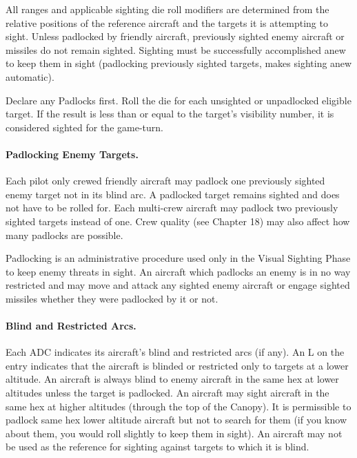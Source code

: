 All ranges and applicable sighting die roll modifiers are determined from the relative positions of the reference aircraft and the targets it is attempting to sight. Unless padlocked by friendly aircraft, previously sighted enemy aircraft or missiles do not remain sighted. Sighting must be successfully accomplished anew to keep them in sight (padlocking previously sighted targets, makes sighting anew automatic).

Declare any Padlocks first. Roll the die for each unsighted or unpadlocked eligible target. If the result is less than or equal to the target's visibility number, it is considered sighted for the game-turn. 

\paragraph{Padlocking Enemy Targets.} Each pilot only crewed friendly aircraft may padlock one previously sighted enemy target not in its blind arc. A padlocked target remains sighted and does not have to be rolled for. Each multi-crew aircraft may padlock two previously sighted targets instead of one. Crew quality (see Chapter 18) may also affect how many padlocks are possible.

Padlocking is an administrative procedure used only in the Visual Sighting Phase to keep enemy threats in sight. An aircraft which padlocks an enemy is in no way restricted and may move and attack any sighted enemy aircraft or engage sighted missiles whether they were padlocked by it or not. 

\paragraph{Blind and Restricted Arcs.} Each ADC indicates its aircraft's blind and restricted arcs (if any). An L on the entry indicates that the aircraft is blinded or restricted only to targets at a lower altitude. An aircraft is always blind to enemy aircraft in the same hex at lower altitudes unless the target is padlocked. An aircraft may sight aircraft in the same hex at higher altitudes (through the top of the Canopy). It is permissible to padlock same hex lower altitude aircraft but not to search for them (if you know about them, you would roll slightly to keep them in sight). An aircraft may not be used as the reference for sighting against targets to which it is blind.

